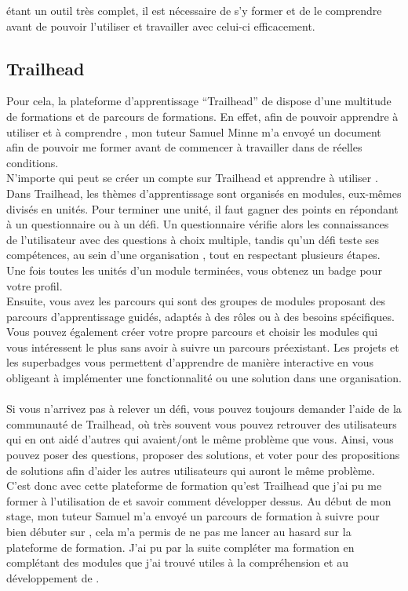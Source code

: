 \documentclass[12pt,oneside,noprintercorrection]{iut}
\begin{document}
\slf{} étant un outil très complet, il est nécessaire de s'y former et de le comprendre avant de pouvoir l'utiliser et travailler avec celui-ci efficacement.

\subsection{Trailhead}
Pour cela, la plateforme d'apprentissage ``Trailhead'' de \slf{} dispose d'une multitude de formations et de parcours de formations. En effet, afin de pouvoir apprendre à utiliser et à comprendre \slf{}, mon tuteur Samuel Minne m'a envoyé un document afin de pouvoir me former avant de commencer à travailler dans de réelles conditions. ~\\\indent
N'importe qui peut se créer un compte sur Trailhead et apprendre à utiliser \slf{}. Dans Trailhead, les thèmes d'apprentissage sont organisés en modules, eux-mêmes divisés en unités. Pour terminer une unité, il faut gagner des points en répondant à un questionnaire ou à un défi. Un questionnaire vérifie alors les connaissances de l'utilisateur avec des questions à choix multiple, tandis qu'un défi teste ses compétences, au sein d'une organisation \slf{}, tout en respectant plusieurs étapes. Une fois toutes les unités d'un module terminées, vous obtenez un badge pour votre profil.
~\\\indent Ensuite, vous avez les parcours qui sont des groupes de modules proposant des parcours d'apprentissage guidés, adaptés à des rôles ou à des besoins spécifiques. Vous pouvez également créer votre propre parcours et choisir les modules qui vous intéressent le plus sans avoir à suivre un parcours préexistant. Les projets et les superbadges vous permettent d'apprendre de manière interactive en vous obligeant à implémenter une fonctionnalité ou une solution dans une organisation.
~\\\indent Si vous n'arrivez pas à relever un défi, vous pouvez toujours demander l'aide de la communauté de Trailhead, où très souvent vous pouvez retrouver des utilisateurs qui en ont aidé d'autres qui avaient/ont le même problème que vous. Ainsi, vous pouvez poser des questions, proposer des solutions, et voter pour des propositions de solutions afin d'aider les autres utilisateurs qui auront le même problème.
~\\\indent C'est donc avec cette plateforme de formation qu'est Trailhead que j'ai pu me former à l'utilisation de \slf{} et savoir comment développer dessus. Au début de mon stage, mon tuteur Samuel m'a envoyé un parcours de formation à suivre pour bien débuter sur \slf{}, cela m'a permis de ne pas me lancer au hasard sur la plateforme de formation. J'ai pu par la suite compléter ma formation en complétant des modules que j'ai trouvé utiles à la compréhension et au développement de \slf{}.
\end{document}

